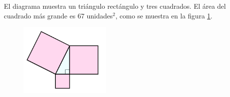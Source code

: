 El diagrama muestra un triángulo rectángulo y tres cuadrados.
El área del cuadrado más grande es 67 unidades$^2$, como se muestra en la figura \ref{fig:area12}.
\begin{multicols}{2}
\begin{figure}[H]
    \begin{center}
        \includegraphics[width=0.4\textwidth]{../images/area12.png}
    \end{center}
    \caption{}
    \label{fig:area12}
\end{figure}

\columnbreak

\end{multicols}